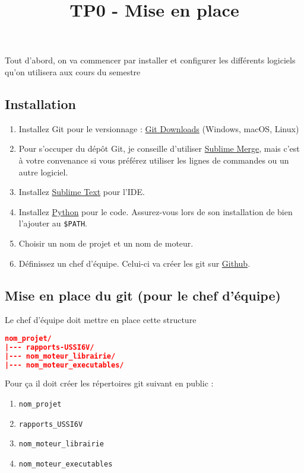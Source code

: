 \documentclass[a4paper,12pt]{article}
\title{TP0 - Mise en place}
\author{}
\date{}
\begin{document}
\makeonlytitle


Tout d'abord, on va commencer par installer et configurer les différents logiciels qu'on utilisera aux cours du semestre

\subsection{Installation}

\begin{enumerate}
    \item Installez Git pour le versionnage : \href{https://git-scm.com/downloads}{Git Downloads} (Windows, macOS, Linux)
    \item Pour s'occuper du dépôt Git, je conseille d'utiliser \href{https://www.sublimemerge.com/}{Sublime Merge}, mais c'est à votre convenance si vous préférez utiliser les lignes de commandes ou un autre logiciel.
    \item Installez \href{https://www.sublimetext.com/}{Sublime Text} pour l'IDE. 
    \item Installez \href{https://www.python.org/downloads/}{Python} pour le code. Assurez-vous lors de son installation de bien l'ajouter au \texttt{\$PATH}.
    \item Choisir un nom de projet et un nom de moteur. 
    \item Définissez un chef d'équipe. Celui-ci va créer les git sur \href{https://github.com/}{Github}. 
\end{enumerate}

\subsection{Mise en place du git (pour le chef d'équipe)}

Le chef d'équipe doit mettre en place cette structure
\begin{lstlisting}[language=json]
nom_projet/
|--- rapports-USSI6V/
|--- nom_moteur_librairie/
|--- nom_moteur_executables/
\end{lstlisting}

Pour ça il doit créer les répertoires git suivant en public : 
\begin{enumerate}
    \item \texttt{nom\_projet} 
    \item \texttt{rapports\_USSI6V}
    \item \texttt{nom\_moteur\_librairie}
    \item \texttt{nom\_moteur\_executables}
\end{enumerate}
\end{document}
